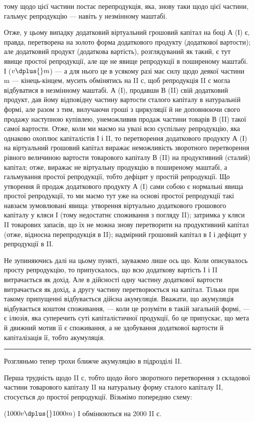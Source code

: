\parcont{}  %
тому щодо цієї частини постає перепродукція, яка, знову таки щодо цієї
частини, гальмує репродукцію — навіть у незмінному маштабі.

Отже, у цьому випадку додатковий віртуальний грошовий капітал на
боці А (І) є, правда, перетворена на золото форма додаткового продукту
(додаткової вартости); але додатковий продукт (додаткова вартість), розглядуваний
як такий, є тут явище простої репродукції, але ще не явище
репродукції в поширеному маштабі. І ($v \dplus{} m$) — а для нього це в усякому
разі має силу щодо деякої частини m — кінець-кінцем, мусить обмінятись
на II с, щоб репродукція II с могла відбуватися в незмінному маштабі.
А (І), продавши В (II) свій додатковий продукт, дав йому відповідну
частину вартости сталого капіталу в натуральній формі, але разом з тим,
вилучаючи гроші з циркуляції й не доповнюючи свого продажу наступною
купівлею, унеможливив продаж частини товарів В (II) такої самої
вартости. Отже, коли ми маємо на увазі всю суспільну репродукцію, яка
однаково охоплює капіталістів І і II, то перетворення додаткового продукту
А (І) на віртуальний грошовий капітал виражає неможливість зворотного
перетворення рівного величиною вартости товарового капіталу
В (II) на продуктивний (сталий) капітал; отже, виражає не віртуальну
продукцію в поширеному маштабі, а гальмування простої репродукції,
тобто дефіцит у простій репродукції. Що утворення й продаж додаткового
продукту А (І) сами собою є нормальні явища простої репродукції,
то ми маємо тут уже на основі простої репродукції такі навзаєм зумовлювані
явища: утворення віртуально додаткового грошового капіталу у
кляси І (тому недостатнє споживання з погляду II); затримка у кляси II
товарових запасів, що їх не можна знову перетворити на продуктивний
капітал (отже, відносна перепродукція в II); надмірний грошовий капітал
в І і дефіцит у репродукції в II.

Не зупиняючись далі на цьому пункті, зауважмо лише ось що.
Коли описувалось просту репродукцію, то припускалось, що всю додаткову
вартість І і II витрачається як дохід. Але в дійсності одну частину
додаткової вартости витрачається як дохід, а другу частину перетворюється
на капітал. Тільки при такому припущенні відбувається дійсна
акумуляція. Вважати, що акумуляція відбувається коштом споживання, —
коли це розуміти в такій загальній формі, — є ілюзія, яка суперечить суті
капіталістичної продукції, бо це припускає, що мета й движний мотив
її є споживання, а не здобування додаткової вартости й капіталізація її,
тобто акумуляція.

\pfbreak

Розгляньмо тепер трохи ближче акумуляцію в підрозділі II.

Перша трудність щодо II $с$, тобто щодо його зворотного перетворення
з складової частини товарового капіталу II на натуральну форму
сталого капіталу II, стосується до простої репродукції. Візьмімо попередню
схему:
\begin{center}
  ($1000 v \dplus{} 1000 m$) І обмінюються на
  2000 II $с$.
\end{center}
